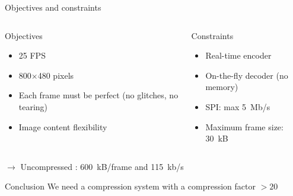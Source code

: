 \documentclass[10pt]{beamer}
\begin{document}
\begin{frame}{Objectives and constraints}
    \begin{columns}
        \begin{column}{0.49\textwidth}
            \begin{exampleblock}{Objectives}
                \begin{itemize}
                    \item 25 FPS
                    \item 800$\times$480 pixels
                    \item Each frame must be perfect (no glitches, no tearing)
                    \item Image content flexibility 
                \end{itemize}
            \end{exampleblock}
        \end{column}

        \begin{column}{0.49\textwidth}
            \begin{alertblock}{Constraints}
                \begin{itemize}
                    \item Real-time encoder
                    \item On-the-fly decoder (no memory)
                    \item SPI: max \SI{5}{Mb/s}
                    \item Maximum frame size: \SI{30}{kB}
                \end{itemize}
            \end{alertblock}
        \end{column}
    \end{columns}

    $\to$ Uncompressed : \SI{600}{kB/frame} and \SI{115}{kb/s}

    \begin{block}{Conclusion}
        We need a compression system with a compression factor $> 20$      
    \end{block}
\end{frame}
\end{document}
